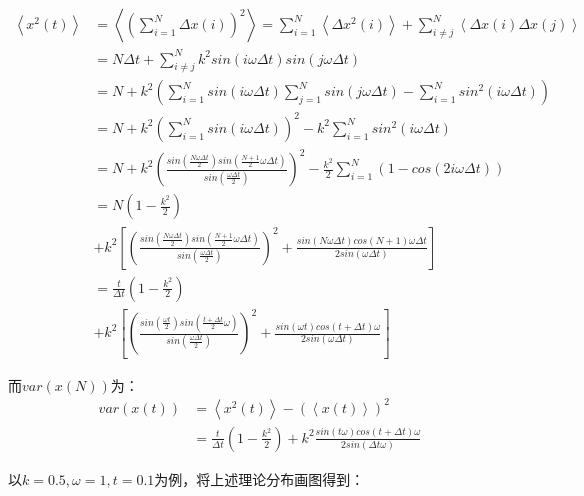 \documentclass[a4paper,11pt]{article}
\begin{document}
 \begin{equation}
 \begin{aligned}
 	\left<x^{2}(t) \right> &= \left< \left( \sum_{i=1}^{N} \Delta x(i) \right)^{2} \right> = \sum_{i=1}^{N} \left<\Delta x^{2}(i) \right> + \sum_{i \neq j }^{N} \left< \Delta x(i) \Delta x(j) \right> \\
 	&= N\Delta t + \sum_{i \neq j }^{N} k^{2}sin(i\omega \Delta t)sin(j \omega \Delta t) \\
 	&= N + k^{2}\left(   \sum_{i=1}^{N} sin(i\omega \Delta t) \sum_{j=1}^{N} sin(j\omega \Delta t)  - \sum_{i=1}^{N} sin^{2}(i\omega \Delta t)  \right)  \\
 	&= N + k^{2} \left( \sum_{i=1}^{N}sin(i\omega \Delta t) \right)^{2} - k^{2} \sum_{i=1}^{N}sin^{2}(i\omega \Delta t) \\
 	&= N + k^{2} \left(  \frac{sin(\frac{N\omega \Delta t}{2}) sin(\frac{N+1}{2}\omega \Delta t)}{sin(\frac{\omega \Delta t}{2} )}  \right)^{2}  -  \frac{k^{2}}{2}  \sum_{i=1}^{N}  \left(  1-cos(2i\omega \Delta t)  \right)  \\
 	&=   N \left(1-\frac{k^{2}}{2} \right) \\
 	& +  k^{2} \left[ \left(  \frac{sin(\frac{N\omega \Delta t}{2}) sin(\frac{N+1}{2}\omega \Delta t)}{sin(\frac{\omega \Delta t}{2} )}  \right)^{2}  +  \frac{sin(N\omega \Delta t) cos(N+1)\omega \Delta t}{2sin(\omega \Delta t)} \right] \\
 	&= \frac{t}{\Delta t} \left(1-\frac{k^{2}}{2} \right) \\
 	& +  k^{2} \left[ \left(  \frac{sin(\frac{\omega t}{2}) sin(\frac{t+\Delta t}{2}\omega )}{sin(\frac{\omega \Delta t}{2} )}  \right)^{2}  +  \frac{sin(\omega t) cos(t+\Delta t)\omega}{2sin(\omega \Delta t)} \right]
 \end{aligned}
 \end{equation}
 
 而$var(x(N))$为：
 \begin{equation}
 \begin{aligned}
 	var(x(t)) &= \left<x^{2}(t) \right> - \left(\left< x(t) \right> \right)^{2} \\
 	&= \frac{t}{\Delta t}  \left(1-\frac{k^{2}}{2} \right) +	 k^{2} \frac{sin(t\omega) cos(t+\Delta t)\omega}{2sin(\Delta t \omega)}
 \end{aligned}
 \end{equation}

以$k=0.5,\omega = 1,t=0.1$为例，将上述理论分布画图得到：
 
\end{document}
